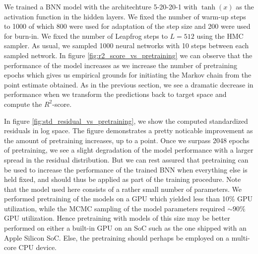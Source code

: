 We trained a BNN model with the architechture 5-20-20-1 with $\tanh(x)$ as the activation function in the hidden layers. We fixed the number of warm-up steps to 1000 of which 800 were used for adaptation of the step size and 200 were used for burn-in. We fixed the number of Leapfrog steps to $L = 512$ using the HMC sampler. As usual, we sampled 1000 neural networks with 10 steps between each sampled network. In figure \ref{fig:r2_score_vs_pretraining} we can observe that the performance of the model increases as we increase the number of pretraining epochs which gives us empirical grounds for initiating the Markov chain from the point estimate obtained. As in the previous section, we see a dramatic decrease in performance when we transform the predictions back to target space and compute the $R^2$-score. 

In figure \ref{fig:std_residual_vs_pretraining}, we
show the computed standardized residuals in log space. The figure demonstrates a pretty noticable improvement as the amount of pretraining increases, up to a point. Once we surpass 2048 epochs of pretraining, we see a slight degradation of the model performance with a larger spread in the residual distribution. But we can rest assured that pretraining can be used to increase the performance of the trained BNN when everything else is held fixed, and should thus be applied as part of the training procedure. Note that the model used here consists of a rather small number of parameters. We performed pretraining of the models on a GPU which yielded less than 10\% GPU utilization, while the MCMC sampling of the model parameters required $\sim 90\%$ GPU utilization. Hence pretraining with models of this size may be better performed on either a built-in GPU on an SoC such as the one shipped with an Apple Silicon SoC. Else, the pretraining should perhaps be employed on a multi-core CPU device.

